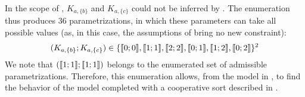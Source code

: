 \begin{example}
In the scope of , $K_{a,\{b\}}$ and $K_{a,\{c\}}$ could not be inferred by .
The enumeration thus produces 36 parametrizations, in which these parameters can take all possible values
(as, in this case, the assumptions of  bring no new constraint):
\begin{align*}
  (K_{a,\{b\}} ; K_{a,\{c\}}) \in \{ \llbracket 0 ; 0 \rrbracket , \llbracket 1 ; 1 \rrbracket , \llbracket 2 ; 2 \rrbracket , \llbracket 0 ; 1 \rrbracket , \llbracket 1 ; 2 \rrbracket , \llbracket 0 ; 2 \rrbracket \}^2
\end{align*}
We note that $(\llbracket 1 ; 1 \rrbracket ; \llbracket 1 ; 1 \rrbracket)$ belongs to the enumerated set of admissible parametrizations.
Therefore, this enumeration allows, from the model in , to find the behavior of the model completed with a cooperative sort described in .
\end{example}



